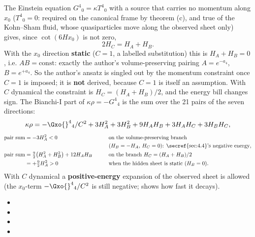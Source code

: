 The Einstein equation $G^4{}_0=\kappa T^4{}_0$ with a source that carries no momentum along $x_0$
($T^4{}_0=0$: required on the canonical frame by theorem (c), and true of the Kohn--Sham fluid, whose
quasiparticles move along the observed sheet only) gives, since $\cot(6Hx_0)$ is not zero,
\[
  2H_C=H_A+H_B .
\]
With the $x_0$ direction \textbf{static} ($C=1$, a labelled substitution) this is $H_A+H_B=0$, i.e.
$AB=\text{const}$: exactly the author's volume-preserving pairing $A=e^{-a_4}$, $B=e^{+a_4}$. So the
author's ansatz is singled out by the momentum constraint once $C=1$ is imposed; it is \textbf{not}
derived, because $C=1$ is itself an assumption. With $C$ dynamical the constraint is
$H_C=(H_A+H_B)/2$, and the energy bill changes sign. The Bianchi-I part of $\kappa\rho=-G^4{}_4$ is the
sum over the 21 pairs of the seven directions:
\[
  \kappa\rho=-\Gxo{}^4{}_4/C^2+3H_A^2+3H_B^2+9H_AH_B+3H_AH_C+3H_BH_C,
\]
\begin{alignat*}{2}
  \text{pair sum}&=-3H_A^2<0 &\qquad&\text{on the volume-preserving branch}\\
  & &&\text{($H_B=-H_A$, $H_C=0$): \secref{sec:4.4}'s negative energy},\\
  \text{pair sum}&=\tfrac92\bigl(H_A^2+H_B^2\bigr)+12H_AH_B &&\text{on the branch } H_C=(H_A+H_B)/2\\
  &=+\tfrac92H_A^2>0 &&\text{when the hidden sheet is static ($H_B=0$).}
\end{alignat*}
With $C$ dynamical a \textbf{positive-energy} expansion of the observed sheet is allowed (the $x_0$-term
$-\Gxo{}^4{}_4/C^2$ is still negative;  shows how fast it decays). 
\begin{itemize}
  \item {}
  \item {}
  \item {}
  \item {}
\end{itemize}

